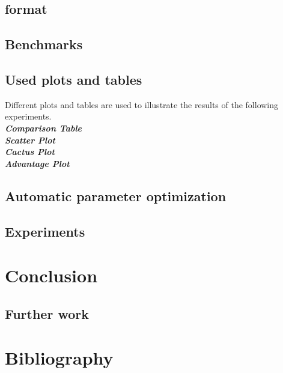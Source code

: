 \documentclass[12pt,a4paper,twoside]{scrartcl}
\numberwithin{equation}{section}
\begin{document}
\subsection{format}
\subsection{Benchmarks}
\label{benchmark}
\subsection{Used plots and tables}
Different plots and tables are used to illustrate the results of the following experiments.\\
\emph{\textbf{Comparison Table}}\\
\emph{\textbf{Scatter Plot}}\\
\emph{\textbf{Cactus Plot}}\\
\emph{\textbf{Advantage Plot}}\\
 \subsection{Automatic parameter optimization}
\subsection{Experiments}
\section{Conclusion}
\subsection{Further work}
\section{Bibliography}


\end{document}
